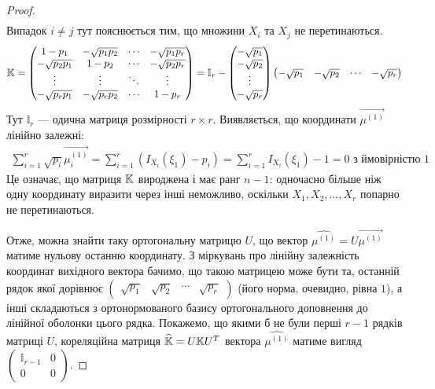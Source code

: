 \begin{proof}
\begin{gather*}
    \end{gather*}
    Випадок $i\neq j$ тут пояснюється тим, що множини $X_i$ та $X_j$ не перетинаються.
    \begin{gather*}
        \mathbb{K} = \begin{pmatrix}
            1 - p_1 & -\sqrt{p_1 p_2} & \cdots & -\sqrt{p_1 p_r} \\
            -\sqrt{p_2 p_1} & 1 - p_2 & \cdots & -\sqrt{p_2 p_r} \\
            \vdots & \vdots & \ddots & \vdots \\
            -\sqrt{p_r p_1} & -\sqrt{p_r p_2} & \cdots & 1 - p_r
        \end{pmatrix} = \mathbb{I}_r - 
        \begin{pmatrix}
            -\sqrt{p_1} \\
            -\sqrt{p_2} \\
            \vdots \\
            -\sqrt{p_r}
        \end{pmatrix} 
        \begin{pmatrix}
            -\sqrt{p_1} & -\sqrt{p_2} & \cdots & -\sqrt{p_r}
        \end{pmatrix}
    \end{gather*}
    Тут $\mathbb{I}_r$ --- одична матриця розмірності $r\times r$.
    Виявляється, що координати $\overrightarrow{\mu^{(1)}}$ лінійно залежні:
    \begin{gather*}
        \sum_{i=1}^r \sqrt{p_i} \overrightarrow{\mu^{(1)}_i} = 
        \sum_{i=1}^r \left(I_{X_i}(\xi_1) - p_i\right) = 
        \sum_{i=1}^r I_{X_i}(\xi_1) - 1 = 0 \text{ з ймовірністю } 1
    \end{gather*}
    Це означає, що матриця $\mathbb{K}$ вироджена і має ранг $n-1$: одночасно більше ніж одну координату виразити через інші неможливо,
    оскільки $X_1, X_2, ..., X_r$ попарно не перетинаються. 
    
    Отже, можна знайти таку ортогональну матрицю $U$, що
    вектор $\widehat{\mu^{(1)}} = U \overrightarrow{\mu^{(1)}}$ матиме нульову останню координату. З міркувань про лінійну залежність координат вихідного вектора
    бачимо, що такою матрицею може бути та, останній рядок якої дорівнює 
    $\begin{pmatrix}
        \sqrt{p_1} & \sqrt{p_2} & \cdots & \sqrt{p_r}
    \end{pmatrix}$ (його норма, очевидно, рівна $1$), а інші складаються з ортонормованого базису ортогонального доповнення до лінійної оболонки цього рядка.
    Покажемо, що якими б не були перші $r-1$ рядків матриці $U$, кореляційна матриця $\widehat{\mathbb{K}} = U \mathbb{K} U^{T}$ вектора $\widehat{\mu^{(1)}}$ матиме
    вигляд $\begin{pmatrix}
        \mathbb{I}_{r-1} & 0 \\
        0 & 0 
    \end{pmatrix}$.


\end{proof}
